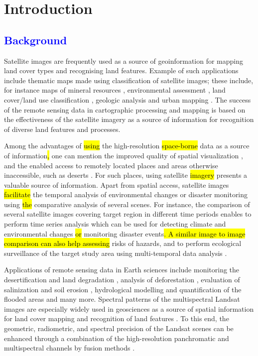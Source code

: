\documentclass[information,article,submit,pdftex,moreauthors]{Definitions/mdpi}
\begin{document}
\section{Introduction}

\subsection{\textcolor{blue}{Background}}
Satellite images are frequently used as a source of geoinformation for mapping land cover types and recognising land features. Example of such applications include thematic maps made using classification of satellite images; these include, for instance maps of mineral resources \cite{ABDELKAREEM2018682,1294518,rs11121450}, environmental assessment \cite{615837,Lemenkova202227}, land cover/land use classification \cite{516791,Lemenkova202229}, geologic analysis \cite{6723607,KAMEL2022104420} and urban mapping \cite{MOHAMED2019103507}. The success of the remote sensing data in cartographic processing and mapping is based on the effectiveness of the satellite imagery as a source of information for recognition of diverse land features and processes. 

Among the advantages of \hl{using }the high-resolution \hl{space-borne }data as a source of information\hl{, }one can mention the improved quality of spatial visualization \cite{ABDALLA20128,Lemenkova202230}, and the enabled access to remotely located places and areas otherwise inaccessible, such as deserts \cite{6350376}. For such places, using satellite \hl{imagery }presents a valuable source of information. Apart from spatial access, satellite images \hl{facilitate }the temporal analysis of environmental changes or disaster monitoring using \hl{the } comparative analysis of several scenes. For instance, the comparison of several satellite images covering target region in different time periods enables to perform time series analysis which can be used for detecting climate and environmental changes \hl{or }monitoring disaster events\hl{. A similar image to image comparison can also help assessing } risks of hazards, and to perform ecological surveillance of the target study area using multi-temporal data analysis \cite{9171725,SINGH2020423,Hashim}. 

Applications of remote sensing data in Earth sciences include monitoring the desertification and land degradation \cite{Badreldin,Kawy}, analysis of deforestation \cite{516791}, evaluation of salinization \cite{8949893} and soil erosion \cite{Gad2020}, hydrological modelling and quantification of the flooded areas \cite{TAHA2017157,ELSADEK2019377} and many more. Spectral patterns of the multispectral Landsat images are especially widely used in geosciences as a source of spatial information for land cover mapping and recognition of land features \cite{8486245}. To this end, the geometric, radiometric, and spectral precision of the Landsat scenes can be enhanced through a combination of the high-resolution panchromatic and multispectral channels by fusion methods \cite{4420687}.
\end{document}
